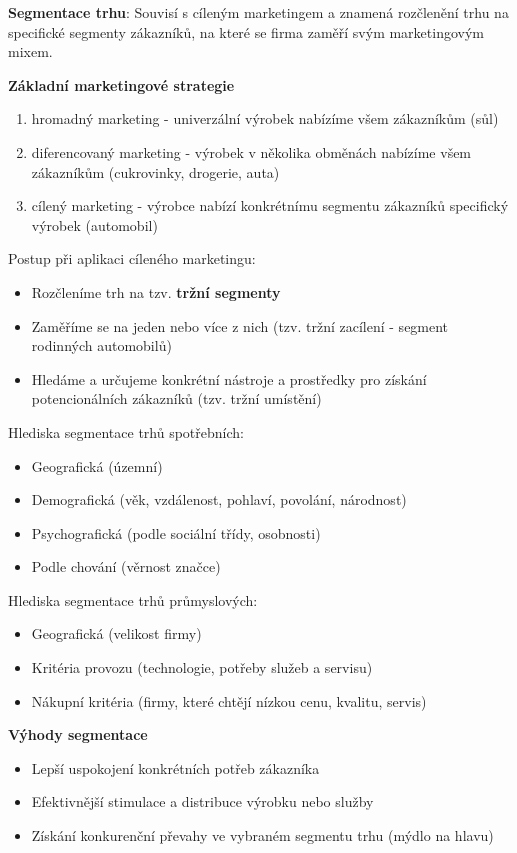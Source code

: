\documentclass[11pt,a4paper,twoside]{book}
\begin{document}
	\textbf{Segmentace trhu}:
	Souvisí s cíleným marketingem a znamená rozčlenění trhu na specifické segmenty zákazníků, na které se firma zaměří svým marketingovým mixem.

	\textbf{Základní marketingové strategie}
	\begin{enumerate}
		\item hromadný marketing - univerzální výrobek nabízíme všem zákazníkům (sůl)
		\item diferencovaný marketing - výrobek v několika obměnách nabízíme všem zákazníkům (cukrovinky, drogerie, auta)
		\item cílený marketing - výrobce nabízí konkrétnímu segmentu zákazníků specifický výrobek (automobil)
	\end{enumerate}

	Postup při aplikaci cíleného marketingu:
	\begin{itemize}
		\item Rozčleníme trh na tzv. \textbf{tržní segmenty}
		\item Zaměříme se na jeden nebo více z nich (tzv. tržní zacílení - segment rodinných automobilů)
		\item Hledáme a určujeme konkrétní nástroje a prostředky pro získání potencionálních zákazníků (tzv. tržní umístění)
	\end{itemize}

	Hlediska segmentace trhů spotřebních:
	\begin{itemize}
		\item Geografická (územní)
		\item Demografická (věk, vzdálenost, pohlaví, povolání, národnost)
		\item Psychografická (podle sociální třídy, osobnosti)
		\item Podle chování (věrnost značce)
	\end{itemize}

	Hlediska segmentace trhů průmyslových:
	\begin{itemize}
		\item Geografická (velikost firmy)
		\item Kritéria provozu (technologie, potřeby služeb a servisu)
		\item Nákupní kritéria (firmy, které chtějí nízkou cenu, kvalitu, servis)
	\end{itemize}

	\textbf{Výhody segmentace}
	\begin{itemize}
		\item Lepší uspokojení konkrétních potřeb zákazníka
		\item Efektivnější stimulace a distribuce výrobku nebo služby
		\item Získání konkurenční převahy ve vybraném segmentu trhu (mýdlo na hlavu)
	\end{itemize}
\end{document}

